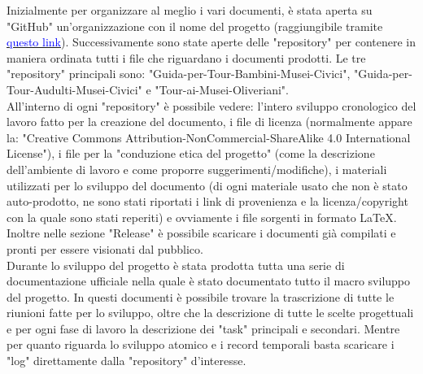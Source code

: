 \documentclass[hidelinks,12pt,a4paper]{article}
\begin{document}
\begin{flushleft}
		\bigskip
		Inizialmente per organizzare al meglio i vari documenti, è stata aperta su "GitHub" un'organizzazione con il nome del progetto (raggiungibile tramite \href{https://github.com/Pomodoro-Musei-di-Pesaro}{\textcolor{blue}{questo link}}). Successivamente sono state aperte delle "repository" per contenere in maniera ordinata tutti i file che riguardano i documenti prodotti. Le tre "repository" principali sono: "Guida-per-Tour-Bambini-Musei-Civici", "Guida-per-Tour-Audulti-Musei-Civici" e "Tour-ai-Musei-Oliveriani".\\
		All'interno di ogni "repository" è possibile vedere: l'intero sviluppo cronologico del lavoro fatto per la creazione del documento,  i file di licenza (normalmente appare la: "Creative Commons Attribution-NonCommercial-ShareAlike 4.0 International License"), i file per la "conduzione etica del progetto" (come la descrizione dell'ambiente di lavoro e come proporre suggerimenti/modifiche), i materiali utilizzati per lo sviluppo del documento (di ogni materiale usato che non è stato auto-prodotto, ne sono stati riportati i link di provenienza e la licenza/copyright con la quale sono stati reperiti) e ovviamente i file sorgenti in formato \LaTeX. Inoltre nelle sezione "Release" è possibile scaricare i documenti già compilati e pronti per essere visionati dal pubblico.\\
		Durante lo sviluppo del progetto è stata prodotta tutta una serie di documentazione ufficiale nella quale è stato documentato tutto il macro sviluppo del progetto. In questi documenti è possibile trovare la trascrizione di tutte le riunioni fatte per lo sviluppo, oltre che la descrizione di tutte le scelte progettuali e per ogni fase di lavoro la descrizione dei "task" principali e secondari. Mentre per quanto riguarda lo sviluppo atomico e i record temporali basta scaricare i "log" direttamente dalla "repository" d'interesse.
		
		\newpage

\end{flushleft}
\end{document}
